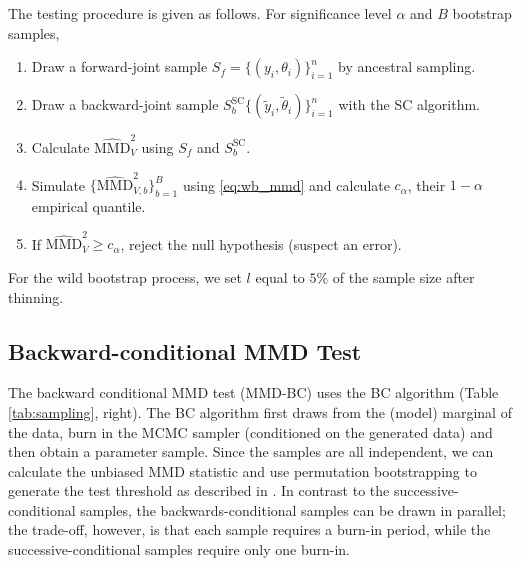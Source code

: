 \documentclass{article}
\begin{document}
The testing procedure is given as follows. For significance level $\alpha$ and $B$ bootstrap samples, 
\begin{enumerate}
    \item Draw a forward-joint sample $S_f=\{(y_i,\theta_i)\}_{i=1}^n$ by ancestral sampling.
    \item Draw a backward-joint sample $S_{b}^{\mathrm{SC}}\{(\tilde{y}_i, \tilde{\theta}_{i})\}_{i=1}^{n}$ with the SC algorithm.
    \item Calculate $\widehat{\mathrm{MMD}}_{V}^{2}$ using $S_f$ and $S_b^{\mathrm{SC}}$.
    \item Simulate $\{\widehat{\mathrm{MMD}}^{2}_{V, b}\}_{b=1}^{B}$ using \eqref{eq:wb_mmd} and calculate $c_{\alpha}$, their $1-\alpha$ empirical quantile.
    \item If $\widehat{\mathrm{MMD}}^{2}_{V} \geq c_{\alpha}$, reject the null hypothesis (suspect an error).
\end{enumerate}
For the wild bootstrap process, we set $l$ equal to $5\%$ of the sample size after thinning.

\subsection{Backward-conditional MMD Test}
The backward conditional MMD test (MMD-BC) uses the BC algorithm (Table \ref{tab:sampling}, right). 
The BC algorithm first draws from the (model) marginal of the data, burn in the MCMC sampler (conditioned on the generated data) and then obtain a parameter sample.
Since the samples are all independent, we can calculate the unbiased MMD statistic and use permutation bootstrapping to generate the test threshold as described in \cite{gretton_kernel_2012}. In contrast to the successive-conditional samples, the backwards-conditional samples can be drawn in parallel; the trade-off, however, is that each sample requires a burn-in period, while the successive-conditional samples require only one burn-in.
\end{document}
